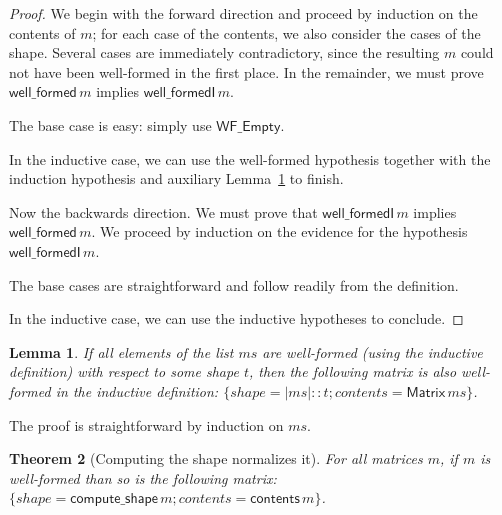 \documentclass[11pt,conference]{IEEEtran}
\newcommand{\var}[1]{\mathit{#1}}
\newcommand{\func}[1]{\mathsf{#1}}
\newcommand{\iname}[1]{\textsf{#1}}
\theoremstyle{plain} %
\newtheorem{thm}{Theorem}[section]
\newtheorem{lem}[thm]{Lemma}
\theoremstyle{definition}
\theoremstyle{remark}
\begin{document}
\begin{proof}
    We begin with the forward direction and proceed by induction on the contents
    of \(m\); for each case of the contents, we also consider the cases of the
    shape. Several cases are immediately contradictory, since the resulting
    \(m\) could not have been well-formed in the first place. In the remainder,
    we must prove \(\func{well\_formed}\, m\) implies \(\func{well\_formedI}\,
    m\).

    The base case is easy: simply use \(\iname{WF\_Empty}\).

    In the inductive case, we can use the well-formed hypothesis together with
    the induction hypothesis and auxiliary Lemma~\ref{Lem:wfI_all_wf_t} to
    finish.

    Now the backwards direction. We must prove that \(\func{well\_formedI}\, m\)
    implies \(\func{well\_formed}\, m\). We proceed by induction on the evidence
    for the hypothesis \(\func{well\_formedI}\, m\).

    The base cases are straightforward and follow readily from the definition.

    In the inductive case, we can use the inductive hypotheses to conclude.
\end{proof}

\begin{lem}\label{Lem:wfI_all_wf_t}
    If all elements of the list \(\var{ms}\) are well-formed (using the inductive
    definition) with respect to some shape \(t\), then the following matrix is
    also well-formed in the inductive definition: \(\{ \var{shape} = |\var{ms}|
    :: t; \var{contents} = \func{Matrix}\, \var{ms} \}\).
\end{lem}

The proof is straightforward by induction on \(\var{ms}\).

\begin{thm}[Computing the shape normalizes it]\label{Th:compute_shape_wf_normalizes}
    For all matrices \(m\), if \(m\) is well-formed than so is the following
    matrix: \(\{ \var{shape} = \func{compute\_shape}\, m; \var{contents} =
    \func{contents}\, m \}\).
\end{thm}
\end{document}
